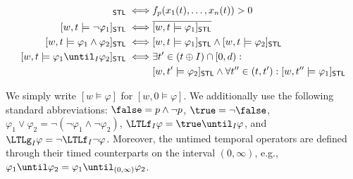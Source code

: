 \small
\begin{align*}
	[w,t \models p]_{\mathsf{STL}} \iff & f_p(x_1(t), \ldots, x_n(t)) > 0 \\
	[w,t \models \lnot \varphi_1]_{\mathsf{STL}} \iff & \overline{[w,t \models \varphi_1]_{\mathsf{STL}}} \\
	[w,t \models \varphi_1 \land \varphi_2]_{\mathsf{STL}} \iff & [w,t \models \varphi_1]_{\mathsf{STL}} \land [w,t \models \varphi_2]_{\mathsf{STL}} \\
	[w,t \models \varphi_1 \until_I \varphi_2]_{\mathsf{STL}} \iff & \exists t' \in (t \oplus I) \cap [0,d) :  \\
	& [w,t' \models \varphi_2]_{\mathsf{STL}} \land \forall t'' \in (t, t') : [w,t'' \models \varphi_1]_{\mathsf{STL}} \\
\end{align*}
\normalsize

We simply write $[w \models \varphi]$ for $[w,0 \models \varphi]$.
We additionally use the following standard abbreviations: 
$\false = p \land \lnot p$,
$\true = \lnot \false$,
$ \varphi_1 \lor \varphi_2 = \lnot (\lnot \varphi_1 \land \lnot \varphi_2)$,
$\LTLf_I \varphi = \true \until_I \varphi$, and
$\LTLg_I \varphi = \lnot \LTLf_I \lnot \varphi$.
Moreover, the untimed temporal operators are defined through their timed counterparts on the interval $(0,\infty)$, e.g., $\varphi_1 \until \varphi_2 = \varphi_1 \until_{(0,\infty)} \varphi_2$.



